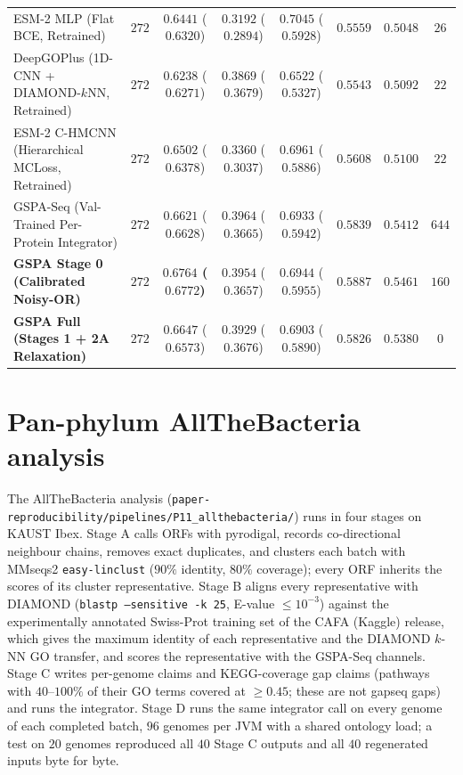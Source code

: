 \documentclass[10pt]{article}
\newcommand{\fn}[1]{\nolinkurl{#1}}
\begin{document}
\begin{table}[h!]
{\begin{tabular}{lccccccc}
    ESM-2 MLP (Flat BCE, Retrained) & $272$ & $0.6441$ ($0.6320$) & $0.3192$ ($0.2894$) & \textbf{$0.7045$} ($0.5928$) & $0.5559$ & $0.5048$ & $26$ \\
    DeepGOPlus (1D-CNN + DIAMOND-$k$NN, Retrained) & $272$ & $0.6238$ ($0.6271$) & $0.3869$ (\textbf{$0.3679$}) & $0.6522$ ($0.5327$) & $0.5543$ & $0.5092$ & $22$ \\
    ESM-2 C-HMCNN (Hierarchical MCLoss, Retrained) & $272$ & $0.6502$ ($0.6378$) & $0.3360$ ($0.3037$) & $0.6961$ ($0.5886$) & $0.5608$ & $0.5100$ & $22$ \\
    GSPA-Seq (Val-Trained Per-Protein Integrator) & $272$ & $0.6621$ ($0.6628$) & \textbf{$0.3964$} ($0.3665$) & $0.6933$ ($0.5942$) & $0.5839$ & $0.5412$ & $644$ \\
    \textbf{GSPA Stage 0 (Calibrated Noisy-OR)} & $272$ & \textbf{$0.6764$ ($0.6772$)} & $0.3954$ ($0.3657$) & $0.6944$ (\textbf{$0.5955$}) & \textbf{$0.5887$} & \textbf{$0.5461$} & $160$ \\
    \textbf{GSPA Full (Stages 1 + 2A Relaxation)} & $272$ & $0.6647$ ($0.6573$) & $0.3929$ ($0.3676$) & $0.6903$ ($0.5890$) & $0.5826$ & $0.5380$ & \textbf{$0$} \\
    \bottomrule
  \end{tabular}%
  }
\end{table}

\section{Pan-phylum AllTheBacteria analysis}
\label{sec:supp_allthebacteria}

The AllTheBacteria analysis (\fn{paper-reproducibility/pipelines/P11_allthebacteria/}) runs in four stages on KAUST Ibex. Stage A calls ORFs with pyrodigal, records co-directional neighbour chains, removes exact duplicates, and clusters each batch with MMseqs2 \texttt{easy-linclust} ($90\%$ identity, $80\%$ coverage); every ORF inherits the scores of its cluster representative. Stage B aligns every representative with DIAMOND (\texttt{blastp --sensitive -k 25}, E-value $\le 10^{-3}$) against the experimentally annotated Swiss-Prot training set of the CAFA (Kaggle) release, which gives the maximum identity of each representative and the DIAMOND $k$-NN GO transfer, and scores the representative with the GSPA-Seq channels. Stage C writes per-genome claims and KEGG-coverage gap claims (pathways with $40$--$100\%$ of their GO terms covered at $\ge 0.45$; these are not gapseq gaps) and runs the integrator. Stage D runs the same integrator call on every genome of each completed batch, $96$ genomes per JVM with a shared ontology load; a test on $20$ genomes reproduced all $40$ Stage C outputs and all $40$ regenerated inputs byte for byte.
\end{document}
